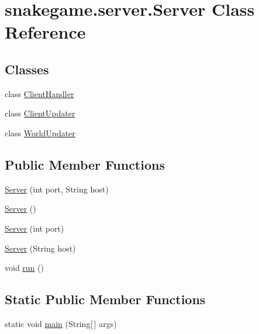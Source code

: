 \hypertarget{classsnakegame_1_1server_1_1_server}{}\section{snakegame.\+server.\+Server Class Reference}
\label{classsnakegame_1_1server_1_1_server}
\subsection*{Classes}
\begin{DoxyCompactItemize}
\item 
class \mbox{\hyperlink{classsnakegame_1_1server_1_1_server_1_1_client_handler}{Client\+Handler}}
\item 
class \mbox{\hyperlink{classsnakegame_1_1server_1_1_server_1_1_client_updater}{Client\+Updater}}
\item 
class \mbox{\hyperlink{classsnakegame_1_1server_1_1_server_1_1_world_updater}{World\+Updater}}
\end{DoxyCompactItemize}
\subsection*{Public Member Functions}
\begin{DoxyCompactItemize}
\item 
\mbox{\hyperlink{classsnakegame_1_1server_1_1_server_a483e80c850ea654902e0843f77eb783d}{Server}} (int port, String host)
\item 
\mbox{\hyperlink{classsnakegame_1_1server_1_1_server_a22825670547a8a66d0f0e8e48577101b}{Server}} ()
\item 
\mbox{\hyperlink{classsnakegame_1_1server_1_1_server_a2b8dd5769b5f1d9214a89856ff8923fd}{Server}} (int port)
\item 
\mbox{\hyperlink{classsnakegame_1_1server_1_1_server_af023d23576ddca43c378f1ce18273126}{Server}} (String host)
\item 
void \mbox{\hyperlink{classsnakegame_1_1server_1_1_server_af0101ad4e19f7ffc7ac541af737b5339}{run}} ()
\end{DoxyCompactItemize}
\subsection*{Static Public Member Functions}
\begin{DoxyCompactItemize}
\item 
static void \mbox{\hyperlink{classsnakegame_1_1server_1_1_server_ae7d47dbe33f4e0267a9a118c8541cd2d}{main}} (String\mbox{[}$\,$\mbox{]} args)
\end{DoxyCompactItemize}



